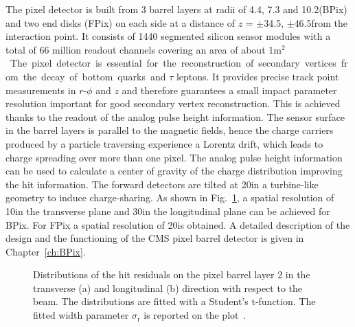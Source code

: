 The pixel detector is built from 3 barrel layers at radii of 4.4, 7.3 and 10.2\cm (BPix) and two end disks (FPix) on each side at a distance of $z$ = $\pm$34.5, $\pm$46.5\cm from the interaction point. It consists of 1440 segmented silicon sensor modules with a total of 66 million readout channels covering an area of about 1\unit{m$^2$}. The pixel detector is essential for the reconstruction of secondary vertices from the decay of bottom quarks and $\tau$ leptons. It provides precise track point measurements in $r$-$\phi$ and $z$ and therefore guarantees a small impact parameter resolution important for good secondary vertex reconstruction. This is achieved thanks to the readout of the analog pulse height information. The sensor surface in the barrel layers is parallel to the magnetic fields, hence the charge carriers produced by a particle traversing experience a Lorentz drift, which leads to charge spreading over more than one pixel. The analog pulse height information can be used to calculate a center of gravity of the charge distribution improving the hit information. The forward detectors are tilted at 20\de in a turbine-like geometry to induce charge-sharing. As shown in Fig.~\ref{fig:pxRes}, a spatial resolution of 10\mum in the transverse plane and 30\mum in the longitudinal plane can be achieved for BPix. For FPix a spatial resolution of 20\mum is obtained. %
A detailed description of the design and the functioning of the CMS pixel barrel detector is given in Chapter~\ref{ch:BPix}.\\

\begin{figure}[h]
 \begin{center}
 \end{center}
 \caption{Distributions of the hit residuals on the pixel barrel layer 2 in the transverse (a) and longitudinal (b) direction with respect to the beam. The distributions are fitted with a Student's t-function. The fitted width parameter $\sigma_\mathrm{r}$ is reported on the plot~\cite{PixelOffline}.}
 \label{fig:pxRes}
\end{figure}

